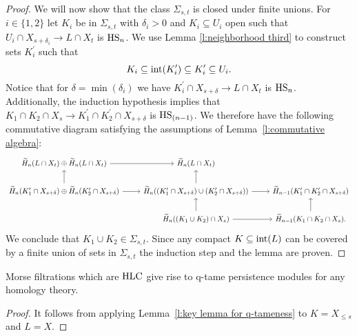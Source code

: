 \begin{proof}
	We will now show that the class $\Sigma_{s,t}$ is closed under finite unions.
	For $i \in \{1, 2\}$ let $K_i$ be in $\Sigma_{s,t}$ with $\delta_i > 0$ and $K_i \subseteq U_i$ open such that $U_{i} \cap X_{s+\delta_i} \to L \cap X_{t}$ is $\mathrm{HS}_n$.
	We use Lemma \ref{l:neighborhood third} to construct sets $K_i^\prime$ such that
	\begin{equation*}
	K_i \subseteq \operatorname{int}(K_i^\prime) \subseteq K_i^\prime \subseteq U_i.
	\end{equation*}
	Notice that for $\delta = \min(\delta_i)$ we have $K_i^\prime \cap X_{s+\delta} \to L \cap X_t$ is $\mathrm{HS}_n$.
	Additionally, the induction hypothesis implies that $K_1 \cap K_2 \cap X_s \to K_1^\prime \cap K_2^\prime \cap X_{s+\delta}$ is $\mathrm{HS}_{(n-1)}$.
	We therefore have the following commutative diagram satisfying the assumptions of Lemma~\ref{l:commutative algebra}:
	\begin{equation*}
	\begin{tikzcd}
	\H_n(L \cap X_t) \oplus \H_n(L \cap X_t) \arrow[r] &
	\H_n(L \cap X_t) & \\
	\H_{n}(K_1^\prime \cap X_{s+\delta}) \oplus \H_n(K_2^\prime \cap X_{s+\delta}) \arrow[r] \arrow[u] & 
	\H_{n}((K_1^\prime \cap X_{s+\delta}) \cup (K_2^\prime \cap X_{s+\delta})) \arrow[r] \arrow[u] &
	\H_{n-1}(K_1^\prime \cap K_2^\prime \cap X_{s+\delta}) \\ & 
	\H_{n}((K_1 \cup K_2) \cap X_s) \arrow[r] \arrow[u] &
	\H_{n-1}(K_1 \cap K_2 \cap X_s). \arrow[u]
	\end{tikzcd}
	\end{equation*}
	We conclude that $K_1 \cup K_2 \in \Sigma_{s, t}$.
	Since any compact $K \subseteq \operatorname{int}(L)$ can be covered by a finite union of sets in $\Sigma_{s,t}$ the induction step and the lemma are proven.
\end{proof}

\begin{thm} \label{t:strong local connectenss implies q-tameness}
	Morse filtrations which are $\mathrm{HLC}$ give rise to q-tame persistence modules for any homology theory.
\end{thm}

\begin{proof}
	It follows from applying Lemma~\ref{l:key lemma for q-tameness} to $K = X_{\leq s}$ and $L = X$.
\end{proof}
